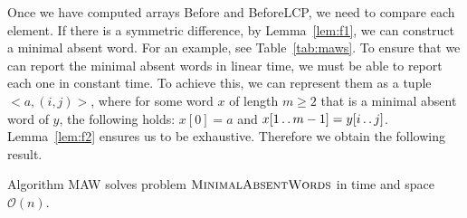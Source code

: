 \documentclass{llncs}
\newcommand{\MAW}{\textsc{MinimalAbsentWords}}
\def\dd{\mathinner{.\,.}}
\newcommand{\cO}{\mathcal{O}}
\newcommand{\Before}{\textsf{Before}}
\newcommand{\BeforeLCP}{\textsf{BeforeLCP}}
\begin{document}
  Once we have computed arrays \Before{} and \BeforeLCP{}, we need to compare each element.
  If there is a symmetric difference, by Lemma~\ref{lem:f1}, we can construct a minimal absent word. For an example, see Table~\ref{tab:maws}. 
  To ensure that we can report the minimal absent words in linear time, we must be able to report each one in constant time. 
  To achieve this, we can represent them as a tuple $<a,(i,j)>$, where for some word $x$ of length $m \geq 2$ that is a minimal absent word of $y$, 
  the following holds: $x[0]=a$ and $x[1 \dd m-1] = y[i \dd j]$. Lemma~\ref{lem:f2} ensures us to be exhaustive. Therefore we obtain the following result.
\begin{theorem}
Algorithm \textsf{MAW} solves problem $\MAW$ in time and space $\cO(n)$.
\label{the:main}
\end{theorem}
\end{document}
